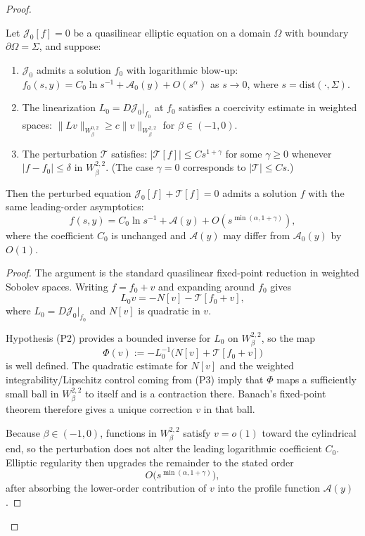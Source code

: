 \begin{proof}
\begin{lemma}\label{lem:perturbation-stability}
Let $\mathcal{J}_0[f] = 0$ be a quasilinear elliptic equation on a domain $\Omega$ with boundary $\partial\Omega = \Sigma$, and suppose:
\begin{enumerate}
    \item[(P1)] $\mathcal{J}_0$ admits a solution $f_0$ with logarithmic blow-up: $f_0(s,y) = C_0 \ln s^{-1} + \mathcal{A}_0(y) + O(s^\alpha)$ as $s \to 0$, where $s = \mathrm{dist}(\cdot, \Sigma)$.
    \item[(P2)] The linearization $L_0 = D\mathcal{J}_0|_{f_0}$ at $f_0$ satisfies a coercivity estimate in weighted spaces: $\|Lv\|_{W^{0,2}_\beta} \geq c\|v\|_{W^{2,2}_\beta}$ for $\beta \in (-1,0)$.
    \item[(P3)] The perturbation $\mathcal{T}$ satisfies: $|\mathcal{T}[f]| \leq C s^{1+\gamma}$ for some $\gamma \geq 0$ whenever $|f - f_0| \leq \delta$ in $W^{2,2}_\beta$. (The case $\gamma = 0$ corresponds to $|\mathcal{T}| \leq Cs$.)
\end{enumerate}
Then the perturbed equation $\mathcal{J}_0[f] + \mathcal{T}[f] = 0$ admits a solution $f$ with the same leading-order asymptotics:
\[
f(s,y) = C_0 \ln s^{-1} + \mathcal{A}(y) + O(s^{\min(\alpha, 1+\gamma)}),
\]
where the coefficient $C_0$ is unchanged and $\mathcal{A}(y)$ may differ from $\mathcal{A}_0(y)$ by $O(1)$.
\end{lemma}

\begin{proof}
The argument is the standard quasilinear fixed-point reduction in weighted Sobolev spaces. Writing $f=f_0+v$ and expanding around $f_0$ gives
\begin{equation}\label{eq:fixed-point}
L_0 v = -N[v] - \mathcal{T}[f_0+v],
\end{equation}
where $L_0=D\mathcal{J}_0|_{f_0}$ and $N[v]$ is quadratic in $v$.

Hypothesis (P2) provides a bounded inverse for $L_0$ on $W^{2,2}_\beta$, so the map
\[
\Phi(v):=-L_0^{-1}\bigl(N[v]+\mathcal{T}[f_0+v]\bigr)
\]
is well defined. The quadratic estimate for $N[v]$ and the weighted integrability/Lipschitz control coming from (P3) imply that $\Phi$ maps a sufficiently small ball in $W^{2,2}_\beta$ to itself and is a contraction there. Banach's fixed-point theorem therefore gives a unique correction $v$ in that ball.

Because $\beta\in(-1,0)$, functions in $W^{2,2}_\beta$ satisfy $v=o(1)$ toward the cylindrical end, so the perturbation does not alter the leading logarithmic coefficient $C_0$. Elliptic regularity then upgrades the remainder to the stated order
\[
O\!\bigl(s^{\min(\alpha,1+\gamma)}\bigr),
\]
after absorbing the lower-order contribution of $v$ into the profile function $\mathcal{A}(y)$.
\end{proof}


\end{proof}
